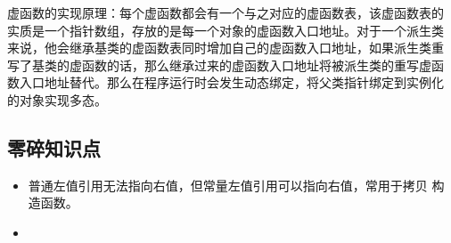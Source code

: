 虚函数的实现原理：每个虚函数都会有一个与之对应的虚函数表，该虚函数表的
实质是一个指针数组，存放的是每一个对象的虚函数入口地址。对于一个派生类
来说，他会继承基类的虚函数表同时增加自己的虚函数入口地址，如果派生类重
写了基类的虚函数的话，那么继承过来的虚函数入口地址将被派生类的重写虚函
数入口地址替代。那么在程序运行时会发生动态绑定，将父类指针绑定到实例化
的对象实现多态。 

\subsection{零碎知识点}

\begin{itemize}
\item 普通左值引用无法指向右值，但常量左值引用可以指向右值，常用于拷贝
  构造函数。
\item 
\end{itemize}

